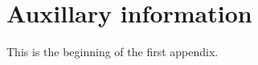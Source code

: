 \documentclass[paper.tex]{subfiles}
\begin{document}
\appendix
\section{Auxillary information}
This is the beginning of the first appendix.
\end{document}
